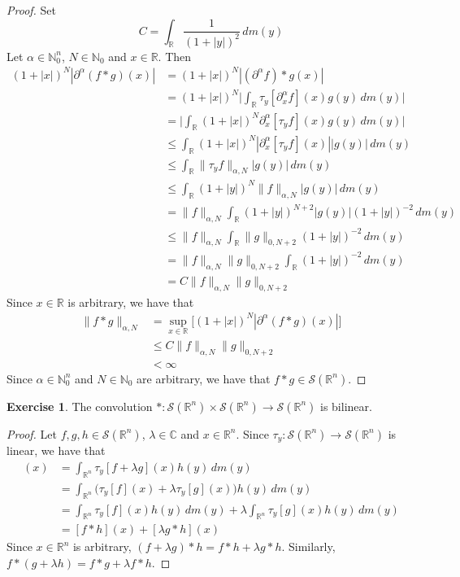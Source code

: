 \documentclass{book}
\theoremstyle{definition}
\newtheorem{ex}[definition]{Exercise}
\newcommand{\al}{\alpha}
\newcommand{\lam}{\lambda}
\newcommand{\C}{\mathbb{C}}
\newcommand{\N}{\mathbb{N}}
\newcommand{\R}{\mathbb{R}}
\newcommand{\MS}{\mathcal{S}}
\DeclareMathOperator*{\0}{\mbf{0}}
\DeclareMathOperator*{\1}{\mbf{1}}
\newcommand{\p}{\partial}
\newcommand{\dm}{\, d m}
\begin{document}
	\begin{proof}
		Set 
		$$C = \int_{\R} \frac{1}{(1+|y|)^2} \dm(y)$$
		Let $\al \in \N_0^n$, $N \in \N_0$ and $x \in \R$. Then 
		\begin{align*}
			(1+|x|)^N |\p^{\al} (f*g)(x)|
			& =   (1+|x|)^N |(\p^{\al}f )*g(x)| \\
			& =   (1+|x|)^N \bigg| \int_{\R}  \tau_y[\p_x^{\al} f ](x) g(y) \dm(y) \bigg|\\
			& =   \bigg| \int_{\R}  (1+|x|)^N \p_x^{\al} [ \tau_y f ](x) g(y) \dm(y) \bigg|\\
			& \leq \int_{\R}  (1+|x|)^N |\p_x^{\al} [ \tau_y f ](x)| |g(y) | \dm(y) \\
			& \leq \int_{\R}  \|\tau_y f\|_{\al, N} |g(y) | \dm(y) \\
			& \leq \int_{\R}  (1 + |y|)^N \|f\|_{\al, N} |g(y) | \dm(y) \\ 
			& = \|f\|_{\al, N}  \int_{\R} (1 + |y|)^{N+2} |g(y)| (1 + |y|)^{-2} \dm(y) \\
			& \leq \|f\|_{\al, N}  \int_{\R}  \|g\|_{0, N+2} (1 + |y|)^{-2} \dm(y) \\
			& = \|f\|_{\al, N} \|g\|_{0, N+2} \int_{\R}  (1 + |y|)^{-2} \dm(y) \\
			&  = C \|f\|_{\al, N} \|g\|_{0, N+2}
		\end{align*}
		Since $x \in \R$ is arbitrary, we have that 
		\begin{align*}
			\|f*g\|_{\al, N}
			& = \sup_{x \in \R} \bigg[ (1+|x|)^N |\p^{\al} (f*g)(x)| \bigg] \\
			& \leq C\|f\|_{\al, N} \|g\|_{0, N+2} \\
			& < \infty
		\end{align*}
		Since $\al \in \N_0^n$ and $N \in \N_0$ are arbitrary, we have that $f*g \in \MS(\R^n)$.
	\end{proof}

	\begin{ex}
		The convolution $*: \MS(\R^n) \times \MS(\R^n) \rightarrow \MS(\R^n)$ is bilinear.
	\end{ex}
	
	\begin{proof} 
		Let $f, g, h \in \MS(\R^n)$, $\lam \in \C$ and $x \in \R^n$. Since $\tau_y: \MS(\R^n) \rightarrow \MS(\R^n)$ is linear, we have that
		\begin{align*}
			[(f + \lam g) * h](x) 
			& = \int_{\R^n} \tau_y[f + \lam g](x) h(y) \dm(y) \\
			& = \int_{\R^n} \bigg( \tau_y[f](x) + \lam \tau_y[g](x) \bigg) h(y) \dm(y) \\
			& = \int_{\R^n} \tau_y[f](x) h(y) \dm(y)  + \lam \int_{\R^n} \tau_y[g](x) h(y) \dm(y) \\
			& = [f* h](x) + [\lam g * h](x)  
		\end{align*}
		Since $x \in \R^n$ is arbitrary, $(f + \lam g) * h = f* h + \lam g * h$. Similarly, $f* (g + \lam h) = f* g + \lam f* h$.
	\end{proof}
	
\end{document}
